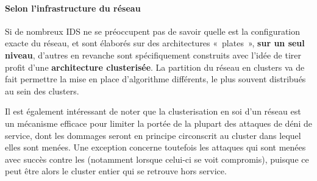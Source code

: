         \paragraph{Selon l'infrastructure du réseau}
Si de nombreux IDS ne se préoccupent pas de savoir quelle est la configuration exacte du réseau, et sont élaborés sur des architectures « plates », \textbf{sur un seul niveau}, d'autres en revanche sont spécifiquement construits avec l'idée de tirer profit d'une \textbf{architecture clusterisée}.
La partition du réseau en clusters va de fait permettre la mise en place d'algorithme différents, le plus souvent distribués au sein des clusters.

Il est également intéressant de noter que la clusterisation en soi d'un réseau est un mécanisme efficace pour limiter la portée de la plupart des attaques de déni de service, dont les dommages seront en principe circonscrit au cluster dans lequel elles sont menées.
Une exception concerne toutefois les attaques qui sont menées avec succès contre les \ch (notamment lorsque celui-ci se voit compromis), puisque ce peut être alors le cluster entier qui se retrouve hors service.

